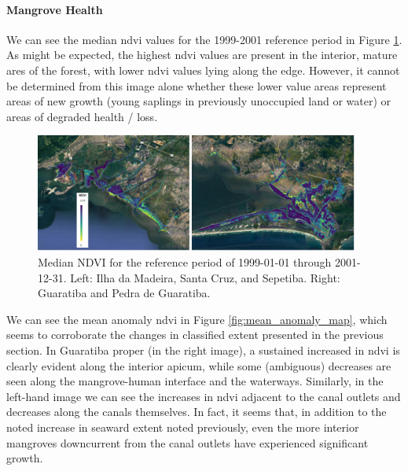 \paragraph{Mangrove Health} \leavevmode\newline

We can see the median \ac{ndvi} values for the 1999-2001 reference period in Figure \ref{fig:reference_median}. As might be expected, the highest \ac{ndvi} values are present in the interior, mature ares of the forest, with lower \ac{ndvi} values lying along the edge. However, it cannot be determined from this image alone whether these lower value areas represent areas of new growth (young saplings in previously unoccupied land or water) or areas of degraded health / loss.  

\begin{figure}[!htb] 
\centering
\includegraphics[width=0.95\textwidth]{Figures/chap4/reference_median.png}
\caption[Reference Median NDVI of Region]{Median NDVI for the reference period of 1999-01-01 through 2001-12-31. Left: Ilha da Madeira, Santa Cruz, and Sepetiba. Right: Guaratiba and Pedra de Guaratiba.}
\label{fig:reference_median}
\end{figure}

We can see the mean anomaly \ac{ndvi} in Figure \ref{fig:mean_anomaly_map}, which seems to corroborate the changes in classified extent presented in the previous section. In Guaratiba proper (in the right image), a sustained increased in \ac{ndvi} is clearly evident along the interior apicum, while some (ambiguous) decreases are seen along the mangrove-human interface and the waterways. Similarly, in the left-hand image we can see the increases in \ac{ndvi} adjacent to the canal outlets and decreases along the canals themselves. In fact, it seems that, in addition to the noted increase in seaward extent noted previously, even the more interior mangroves downcurrent from the canal outlets have experienced significant growth. 

